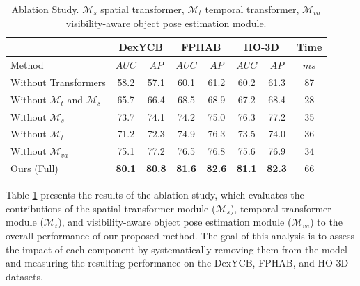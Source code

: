 \begin{table}[h]
\caption{Ablation Study. $\mathcal{M}_{s}$ spatial transformer, $\mathcal{M}_{t}$ temporal transformer, $\mathcal{M}_{va}$ visibility-aware object pose estimation module.}
\label{tab:ablation_ex}
\begin{center}
\begin{tabular}{l c c c c c c c} 
\hline
& \multicolumn{2}{c}{DexYCB} & \multicolumn{2}{c}{FPHAB} & \multicolumn{2}{c}{HO-3D} & Time \\
\hline
Method & $AUC$ & $AP$ & $AUC$ & $AP$ & $AUC$ & $AP$ & $ms$ \\  
\hline 

Without Transformers & 58.2 & 57.1 & 60.1 & 61.2 & 60.2 & 61.3 & 87 \\

Without $\mathcal{M}_{t}$ and $\mathcal{M}_{s}$ & 65.7 & 66.4 & 68.5 & 68.9 & 67.2 & 68.4 & 28 \\

Without $\mathcal{M}_{s}$ & 73.7 & 74.1 & 74.2 & 75.0 & 76.3 & 77.2 & 35 \\

Without $\mathcal{M}_{t}$ & 71.2 & 72.3 & 74.9 & 76.3 & 73.5 & 74.0 & 36 \\

Without $\mathcal{M}_{va}$ & 75.1 & 77.2 & 76.5 & 76.8 & 75.6 & 76.9 & 34 \\

Ours (Full) & \textbf{80.1} & \textbf{80.8} & \textbf{81.6} & \textbf{82.6} & \textbf{81.1} & \textbf{82.3} & 66 \\
\hline
\end{tabular}
\end{center}
\end{table}


Table \ref{tab:ablation_ex} presents the results of the ablation study, which evaluates the contributions of the spatial transformer module ($\mathcal{M}_{s}$), temporal transformer module ($\mathcal{M}_{t}$), and visibility-aware object pose estimation module ($\mathcal{M}_{va}$) to the overall performance of our proposed method. The goal of this analysis is to assess the impact of each component by systematically removing them from the model and measuring the resulting performance on the DexYCB, FPHAB, and HO-3D datasets.

